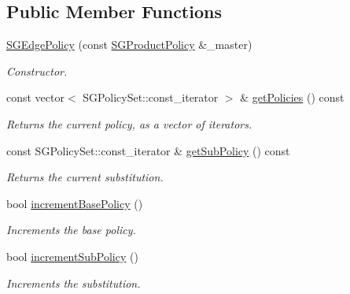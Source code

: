 \subsection*{Public Member Functions}
\begin{DoxyCompactItemize}
\item 
\hyperlink{classSGEdgePolicy_a72828530fdfd5e6d849dadd07ac44724}{S\+G\+Edge\+Policy} (const \hyperlink{classSGProductPolicy}{S\+G\+Product\+Policy} \&\+\_\+master)
\begin{DoxyCompactList}\small\item\em Constructor. \end{DoxyCompactList}\item 
\mbox{\label{classSGEdgePolicy_abb6eb7cff5ea1a9f7007627cbc48a50c}} 
const vector$<$ S\+G\+Policy\+Set\+::const\+\_\+iterator $>$ \& \hyperlink{classSGEdgePolicy_abb6eb7cff5ea1a9f7007627cbc48a50c}{get\+Policies} () const
\begin{DoxyCompactList}\small\item\em Returns the current policy, as a vector of iterators. \end{DoxyCompactList}\item 
\mbox{\label{classSGEdgePolicy_aa055206fa96e03f47547c1fcaaf7d19c}} 
const S\+G\+Policy\+Set\+::const\+\_\+iterator \& \hyperlink{classSGEdgePolicy_aa055206fa96e03f47547c1fcaaf7d19c}{get\+Sub\+Policy} () const
\begin{DoxyCompactList}\small\item\em Returns the current substitution. \end{DoxyCompactList}\item 
\mbox{\label{classSGEdgePolicy_a967bd25525188460c0c4ab4881ed23f9}} 
bool \hyperlink{classSGEdgePolicy_a967bd25525188460c0c4ab4881ed23f9}{increment\+Base\+Policy} ()
\begin{DoxyCompactList}\small\item\em Increments the base policy. \end{DoxyCompactList}\item 
\mbox{\label{classSGEdgePolicy_a07eb755f0281023ad7fc76190b33a83f}} 
bool \hyperlink{classSGEdgePolicy_a07eb755f0281023ad7fc76190b33a83f}{increment\+Sub\+Policy} ()
\begin{DoxyCompactList}\small\item\em Increments the substitution. \end{DoxyCompactList}\item 

\end{DoxyCompactItemize}
